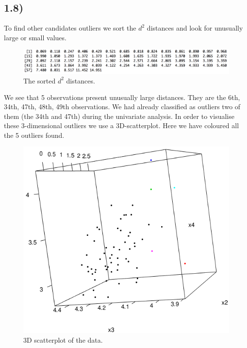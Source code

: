 \documentclass[a4paper,11pt,oneside]{report}
\begin{document}
\subsection*{1.8)}
	To find other candidates outliers we sort the $d^2$ distances and look for unusually large or small values.
	\begin{figure}[h]
	\centering
	\includegraphics[scale = 0.55]{sorted_d.png}
	\caption{The sorted $d^2$ distances.}
	\end{figure}
	We see that 5 observations present unusually large distances. They are the 6th, 34th, 47th, 48th, 49th observations. We had already classified as outliers two of them (the 34th and 47th) during the univariate analysis.
	In order to visualise these 3-dimensional outliers we use a 3D-scatterplot. Here we have coloured all the 5 outliers found.
	\newline
	\begin{figure}[h]
	\centering
	\includegraphics[scale = 0.55]{3dplot1.png}
	\caption{3D scatterplot of the data.}
	\end{figure}
\end{document}

